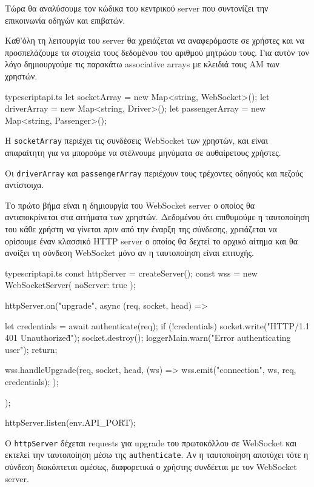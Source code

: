 \documentclass[../thesis.tex]{subfiles}
\begin{document}
Τώρα θα αναλύσουμε τον κώδικα του κεντρικού server που συντονίζει την επικοινωνία οδηγών και επιβατών.

\bigskip

Καθ'όλη τη λειτουργία του server θα χρειάζεται να αναφερόμαστε σε χρήστες και να προσπελάζουμε τα στοιχεία τους δεδομένου του αριθμού μητρώου τους.
Για αυτόν τον λόγο δημιουργούμε τις παρακάτω associative arrays με κλειδιά τους ΑΜ των χρηστών.

\begin{codeblock}{typescript}{api.ts}
  let socketArray = new Map<string, WebSocket>();
  let driverArray = new Map<string, Driver>();
  let passengerArray = new Map<string, Passenger>();
\end{codeblock}

Η \texttt{socketArray} περιέχει τις συνδέσεις WebSocket των χρηστών, και είναι απαραίτητη για να μπορούμε να στέλνουμε μηνύματα σε αυθαίρετους χρήστες.

Οι \texttt{driverArray} και \texttt{passengerArray} περιέχουν τους τρέχοντες οδηγούς και πεζούς αντίστοιχα. 

\bigskip

Το πρώτο βήμα είναι η δημιουργία του WebSocket server ο οποίος θα ανταποκρίνεται στα αιτήματα των χρηστών.
Δεδομένου ότι επιθυμούμε η ταυτοποίηση του κάθε χρήστη να γίνεται \textit{πριν} από την έναρξη της σύνδεσης, χρειάζεται να ορίσουμε έναν κλασσικό HTTP server ο οποίος θα δεχτεί το αρχικό αίτημα και θα ανοίξει τη σύνδεση WebSocket μόνο αν η ταυτοποίηση είναι επιτυχής.

\begin{codeblock}{typescript}{api.ts}
  const httpServer = createServer();
  const wss = new WebSocketServer({ noServer: true });

  httpServer.on("upgrade", async (req, socket, head) => {
    let credentials = await authenticate(req);
    if (!credentials) {
      socket.write("HTTP/1.1 401 Unauthorized\r\n\r\n");
      socket.destroy();
      loggerMain.warn("Error authenticating user");
      return;
    }

    wss.handleUpgrade(req, socket, head, (ws) => {
      wss.emit("connection", ws, req, credentials);
    });
  });  

  httpServer.listen(env.API_PORT);
\end{codeblock}

Ο \texttt{httpServer} δέχεται requests για upgrade του πρωτοκόλλου σε WebSocket και εκτελεί την ταυτοποίηση μέσω της \texttt{authenticate}.
Αν η ταυτοποίηση αποτύχει τότε η σύνδεση διακόπτεται αμέσως, διαφορετικά ο χρήστης συνδέεται με τον WebSocket server.
\end{document}

